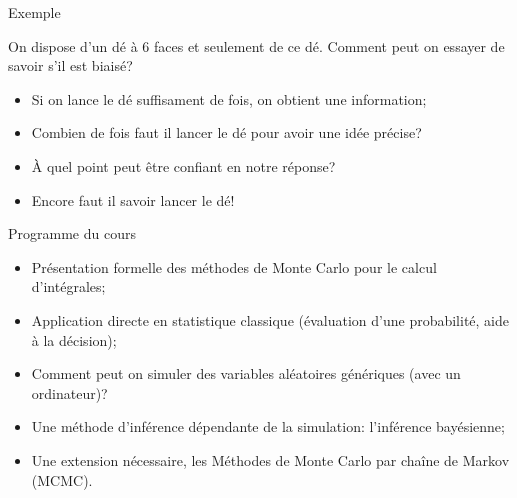 \documentclass[ignorenonframetext,]{beamer}
\providecommand{\tightlist}{%
  \setlength{\itemsep}{0pt}\setlength{\parskip}{0pt}}
\begin{document}
\begin{frame}{Exemple}
\protect\hypertarget{exemple}{}

On dispose d'un dé à 6 faces et seulement de ce dé. Comment peut on
essayer de savoir s'il est biaisé?

\begin{itemize}
\tightlist
\item
  Si on lance le dé suffisament de fois, on obtient une
  information;\pause
\item
  Combien de fois faut il lancer le dé pour avoir une idée
  précise?\pause
\item
  À quel point peut être confiant en notre réponse?\pause
\item
  Encore faut il savoir lancer le dé!
\end{itemize}

\end{frame}

\begin{frame}{Programme du cours}
\protect\hypertarget{programme-du-cours}{}

\begin{itemize}
\tightlist
\item
  Présentation formelle des méthodes de Monte Carlo pour le calcul
  d'intégrales;
\item
  Application directe en statistique classique (évaluation d'une
  probabilité, aide à la décision);\pause
\item
  Comment peut on simuler des variables aléatoires génériques (avec un
  ordinateur)?\pause
\item
  Une méthode d'inférence dépendante de la simulation: l'inférence
  bayésienne;\pause
\item
  Une extension nécessaire, les Méthodes de Monte Carlo par chaîne de
  Markov (MCMC).
\end{itemize}

\end{frame}
\end{document}
